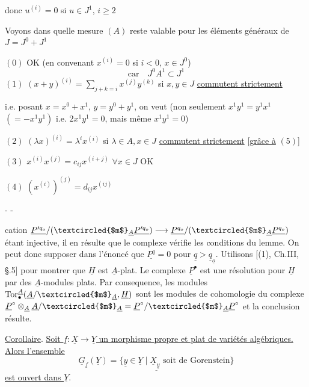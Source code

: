 donc $u^{(i)}=0$ si $u\in J^1$, $i\geq2$

Voyons dans quelle mesure $(A)$ reste valable pour les éléments généraux de $J=J^0+J^1$

$(0)$ OK (en convenant $x^{(i)}=0$ si $i<0$, $x\in J^0$)
\[
\text{car}\quad J^0A^1\subset J^1
\]
$(1)$ $(x+y)^{(i)}=\sum_{j+k=i}x^{(j)}y^{(k)}$ si $x,y\in J$ \uline{commutent strictement}


i.e. posant $x=x^0+x^1$, $y=y^0+y^1$, on veut (non seulement $x^1y^1=y^1x^1$  $(=-x^1y^1)$ i.e. $2x^1y^1=0$, mais même $x^1y^1=0$)

$(2)$ $(\lambda x)^{(i)}=\lambda^i x^{(i)}$ si $\lambda\in A,x\in J$ \uline{commutent strictement} [\uline{grâce à} $(5)$]

$(3)$  $x^{(i)}x^{(j)}=c_{ij}x^{(i+j)}$ \hfill $\forall x\in J$ OK

$(4)$ $(x^{(i)})^{(j)}=d_{ij}x^{(ij)}$

\begin{center}-  -\end{center}

cation $\underline{P'^{q_o}}/(\textcircled{$m$}_{\underline A}\underline{P'^{q_o}})\longrightarrow\underline{P^{q_o}}/(\textcircled{$m$}_{\underline A}\underline{P^{q_o}})$ étant injective, il en résulte que le complexe
vérifie les conditions du lemme. On peut donc supposer dans l'énoncé que $\underline{P^q}=0$ pour $\underline q>\underline q_{\underline o}$. Utilisons [(1), Ch.III, §.5] pour montrer que $\underline H$ est $\underline A$-plat. Le complexe $\underline P^\bullet$ est une résolution pour $\underline H$ par des $\underline A$-modules plats. Par consequence, les modules $\operatorname{Tor}^{\underline A}_{\bullet}(\underline A/\textcircled{$m$}_{\underline A},\underline H)$ sont les modules de cohomologie du complexe $\underline P^\circ\otimes_{\underline A}\underline A/\textcircled{$m$}_{\underline A}=\underline P^\circ/\textcircled{$m$}_{\underline A}\underline P^\circ$ et la conclusion résulte.

\uline{Corollaire}. \uline{Soit $\underline f:\underline X\longrightarrow\underline Y$ un morphisme propre et plat de variétés algébriques. Alors l'ensemble}
\[
\underline{\underline G_{\underline f}(\underline Y)=\{\underline y\in\underline Y\mid\underline X_{\underline y}\text{ soit de Gorenstein}\}}
\]
\uline{est ouvert dans $\underline Y$}.

